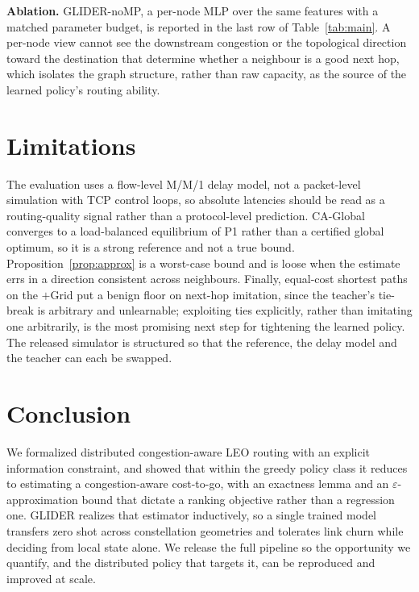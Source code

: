\documentclass[conference]{IEEEtran}
\begin{document}
\textbf{Ablation.} GLIDER-noMP, a per-node MLP over the same features with a matched parameter budget, is reported in the last row of Table~\ref{tab:main}. A per-node view cannot see the downstream congestion or the topological direction toward the destination that determine whether a neighbour is a good next hop, which isolates the graph structure, rather than raw capacity, as the source of the learned policy's routing ability.

\section{Limitations}
The evaluation uses a flow-level M/M/1 delay model, not a packet-level simulation with TCP control loops, so absolute latencies should be read as a routing-quality signal rather than a protocol-level prediction. CA-Global converges to a load-balanced equilibrium of P1 rather than a certified global optimum, so it is a strong reference and not a true bound. Proposition~\ref{prop:approx} is a worst-case bound and is loose when the estimate errs in a direction consistent across neighbours. Finally, equal-cost shortest paths on the $+$Grid put a benign floor on next-hop imitation, since the teacher's tie-break is arbitrary and unlearnable; exploiting ties explicitly, rather than imitating one arbitrarily, is the most promising next step for tightening the learned policy. The released simulator is structured so that the reference, the delay model and the teacher can each be swapped.

\section{Conclusion}
We formalized distributed congestion-aware LEO routing with an explicit information constraint, and showed that within the greedy policy class it reduces to estimating a congestion-aware cost-to-go, with an exactness lemma and an $\varepsilon$-approximation bound that dictate a ranking objective rather than a regression one. GLIDER realizes that estimator inductively, so a single trained model transfers zero shot across constellation geometries and tolerates link churn while deciding from local state alone. We release the full pipeline so the opportunity we quantify, and the distributed policy that targets it, can be reproduced and improved at scale.



\end{document}
